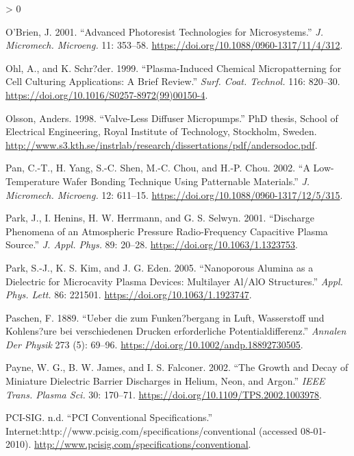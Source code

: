 \documentclass[
  10pt,
  twoside]{article}
\newlength{\cslhangindent}
\newenvironment{CSLReferences}[2] %
 {%
  \setlength{\parindent}{0pt}
  \ifodd #1 \everypar{\setlength{\hangindent}{\cslhangindent}}\ignorespaces\fi
  \ifnum #2 > 0
  \setlength{\parskip}{#2\baselineskip}
  \fi
 }%
 {}
\begin{document}
\begin{CSLReferences}{1}{0}
\leavevmode\hypertarget{ref-Obri01}{}%
O'Brien, J. 2001. {``Advanced Photoresist Technologies for Microsystems.''} \emph{J. Micromech. Microeng.} 11: 353--58. \url{https://doi.org/10.1088/0960-1317/11/4/312}.

\leavevmode\hypertarget{ref-Ohl1999}{}%
Ohl, A., and K. Schr?der. 1999. {``Plasma-Induced Chemical Micropatterning for Cell Culturing Applications: A Brief Review.''} \emph{Surf. Coat. Technol.} 116: 820--30. \url{https://doi.org/10.1016/S0257-8972(99)00150-4}.

\leavevmode\hypertarget{ref-Olss1998}{}%
Olsson, Anders. 1998. {``Valve-Less Diffuser Micropumps.''} PhD thesis, School of Electrical Engineering, Royal Institute of Technology, Stockholm, Sweden. \url{http://www.s3.kth.se/instrlab/research/dissertations/pdf/andersodoc.pdf}.

\leavevmode\hypertarget{ref-Pan02}{}%
Pan, C.-T., H. Yang, S.-C. Shen, M.-C. Chou, and H.-P. Chou. 2002. {``A Low-Temperature Wafer Bonding Technique Using Patternable Materials.''} \emph{J. Micromech. Microeng.} 12: 611--15. \url{https://doi.org/10.1088/0960-1317/12/5/315}.

\leavevmode\hypertarget{ref-Park01}{}%
Park, J., I. Henins, H. W. Herrmann, and G. S. Selwyn. 2001. {``Discharge Phenomena of an Atmospheric Pressure Radio-Frequency Capacitive Plasma Source.''} \emph{J. Appl. Phys.} 89: 20--28. \url{https://doi.org/10.1063/1.1323753}.

\leavevmode\hypertarget{ref-Park05}{}%
Park, S.-J., K. S. Kim, and J. G. Eden. 2005. {``Nanoporous Alumina as a Dielectric for Microcavity Plasma Devices: Multilayer {Al/AlO} Structures.''} \emph{Appl. Phys. Lett.} 86: 221501. \url{https://doi.org/10.1063/1.1923747}.

\leavevmode\hypertarget{ref-Pasc1889}{}%
Paschen, F. 1889. {``{Ueber die zum Funken?bergang in Luft, Wasserstoff und Kohlens?ure bei verschiedenen Drucken erforderliche Potentialdifferenz}.''} \emph{Annalen Der Physik} 273 (5): 69--96. \url{https://doi.org/10.1002/andp.18892730505}.

\leavevmode\hypertarget{ref-Payn02}{}%
Payne, W. G., B. W. James, and I. S. Falconer. 2002. {``The Growth and Decay of Miniature Dielectric Barrier Discharges in Helium, Neon, and Argon.''} \emph{IEEE Trans. Plasma Sci.} 30: 170--71. \url{https://doi.org/10.1109/TPS.2002.1003978}.

\leavevmode\hypertarget{ref-PCI}{}%
PCI-SIG. n.d. {``{PCI} Conventional Specifications.''} Internet:{}http://www.pcisig.com/specifications/conventional (accessed 08-01-2010). \url{http://www.pcisig.com/specifications/conventional}.


\end{CSLReferences}
\end{document}

